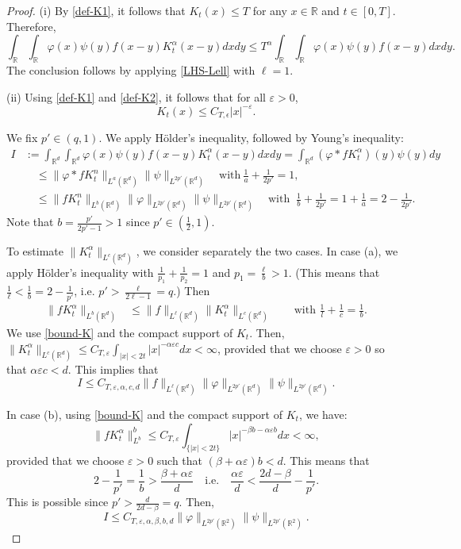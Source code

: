 \documentclass[12pt]{article}
\def\bR{\mathbb{R}}
\begin{document}
\begin{proof} 
(i) By \eqref{def-K1}, it follows that $K_t(x) \leq T$ for any $x \in \bR$ and $t \in [0,T]$. Therefore, 
\[
 \int_{\bR} \int_{\bR} \varphi(x) \psi(y)  f(x-y)K_t^{\alpha}(x-y) dx dy \leq  T^{\alpha} \int_{\bR} \int_{\bR} \varphi(x) \psi(y) f(x-y) dx dy.
\]
The conclusion follows by applying \eqref{LHS-Lell} with $\ell=1$.  

(ii) Using \eqref{def-K1} and \eqref{def-K2}, it follows that for all $\varepsilon > 0$,
\begin{equation}
\label{bound-K}
 K_t(x) \leq C_{T,\epsilon} |x|^{-\varepsilon}.
\end{equation}

We fix $p' \in (q,1)$. We apply H\"older's inequality, followed by Young's inequality:
\begin{align*}
I &:=\int_{\bR^d} \int_{\bR^d}  \varphi(x) \psi(y) f(x-y)K_t^{\alpha}(x-y) dx dy 
= \int_{\bR^d} (\varphi * fK_t^{\alpha})(y) \psi(y) dy \\
& \quad \leq \| \varphi* fK_t^n  \|_{L^a(\bR^d)} \|\psi \|_{L^{2p'}(\bR^d)}  \quad \text{with}\  \frac{1}{a} + \frac{1}{2p'} = 1, \\
& \quad \leq  \| fK_t^n\|_{L^{b}(\bR^d)}  \|\varphi \|_{L^{2p'}(\bR^d)}\|\psi \|_{L^{2p'}(\bR^d)} \quad  \text{with } \  \frac{1}{b} +\frac{1}{2p'} = 1 + \frac{1}{a} = 2 - \frac{1}{2p'} .
\end{align*}
Note that $b=\frac{p'}{2p'-1}>1$ since $p'\in (\frac12,1)$. 

To estimate $\|K_t^{\alpha}\|_{L^{c}(\bR^d)}$, we consider separately the two cases.
In case (a), we apply H\"older's inequality with $\frac{1}{p_1}+\frac{1}{p_2}=1$ and $p_1=\frac{\ell}{b}>1$. (This means that $\frac{1}{\ell}<\frac{1}{b}=2 - \frac{1}{p'}$, i.e. $p'>\frac{\ell}{2\ell -1}=q$.) Then
\begin{align*}
\| fK_t^{\alpha}\|_{L^{b}(\bR^d)}  & \leq \| f\|_{L^\ell(\bR^d)} \|K_t^{\alpha}\|_{L^{c}(\bR^d)} \qquad \text{with } \frac{1}{l} + \frac{1}{c} = \frac{1}{b}.
\end{align*}
We use \eqref{bound-K} and the compact support of $K_t$. Then,
$\|K_t^{\alpha}\|_{L^{c}(\bR^d)} \leq C_{T,\varepsilon}\int_{|x| < 2t} |x|^{-\alpha \varepsilon c} dx < \infty$, provided that we choose $\varepsilon > 0$ so that $\alpha \varepsilon  c< d$. This implies that
\[
I \leq C_{T,\varepsilon,\alpha,c,d} \| f\|_{L^\ell(\bR^d)} \|\varphi\|_{L^{2p'}(\bR^d)}\|\psi\|_{L^{2p'}(\bR^d)}. 
\]

In case (b), using \eqref{bound-K} and the compact support of $K_t$, we have:
\[
\|fK_t^{\alpha}\|_{L^b}^b \leq C_{T,\varepsilon} \int_{\{|x|<2t\}}  |x|^{-\beta b-\alpha\varepsilon  b} dx<  \infty,
\]
provided that we choose $\varepsilon>0$ such that $(\beta+\alpha\varepsilon ) b< d$. This means that 
$$2-\frac{1}{p'}=\frac{1}{b}>\frac{\beta+\alpha \varepsilon}{d} \quad \mbox{i.e.} \quad \frac{\alpha \varepsilon}{d}< \frac{2d-\beta}{d}-\frac{1}{p'}.$$
This is possible since $p'>\frac{d}{2d-\beta} =q$. Then,
\[
I \leq C_{T,\varepsilon,\alpha,\beta,b,d} \|\varphi\|_{L^{2p'}(\bR^2)}\|\psi\|_{L^{2p'}(\bR^2)}. 
\]
\end{proof}
\end{document}
